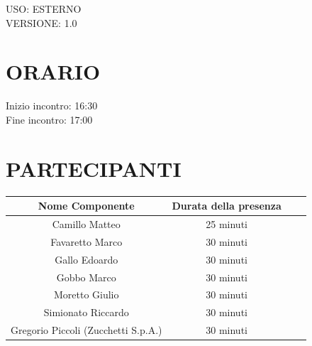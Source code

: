 \documentclass[5pt]{article}
\begin{document}
\begin{flushright}
    \begin{spacing}{1}
        USO: ESTERNO\\
        VERSIONE: 1.0\\
    \end{spacing}
\end{flushright}


\restoregeometry

\pagebreak


\section{ORARIO}
\begin{spacing}{1.5}
    {\large Inizio incontro: 16:30}\\
    {\large Fine incontro: 17:00} %
\end{spacing}

\section{PARTECIPANTI}
\setlength\cellspacetoplimit{6pt}
\setlength\cellspacebottomlimit{6pt}

\begin{table}[ht]
  \begin{tabular}{|Sc|Sc|}
    \hline
    \textbf{Nome Componente} & \textbf{Durata della presenza} \\
    \hline
    Camillo Matteo & 25 minuti \\ %
    Favaretto Marco & 30 minuti \\
    Gallo Edoardo & 30 minuti \\
    Gobbo Marco & 30 minuti \\
    Moretto Giulio & 30 minuti \\
    Simionato Riccardo & 30 minuti \\
    Gregorio Piccoli (Zucchetti S.p.A.) & 30 minuti \\
    \hline
  \end{tabular}
  \label{tab:conference}
\end{table}
\end{document}
